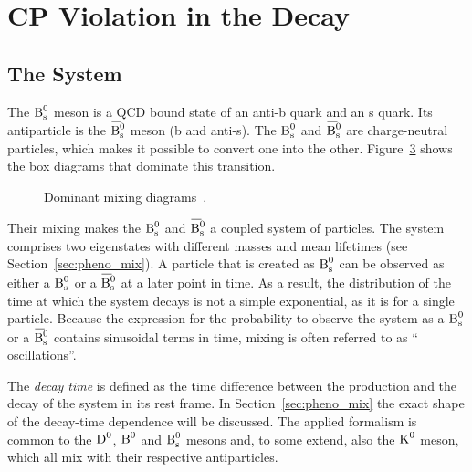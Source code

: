 \section{CP Violation in the \texorpdfstring{\BstoJpsiphi{}}{Bs0->Jpsiphi} Decay}
\label{sec:intro_Jpsiphi}

\subsection{The \texorpdfstring{\BsBsbar{}}{Bs0-Bs0bar} System}
\label{subsec:intro_Jpsiphi_Bs}

The $\text{B}_\text{s}^\text{0}$ meson is a QCD bound state of an anti-b quark and an s quark. Its antiparticle is the $\Bsbar$ meson (b and anti-s). The $\text{B}_\text{s}^\text{0}$
and $\Bsbar$ are charge-neutral particles, which makes it possible to convert one into the other.  Figure~\ref{fig:mixing} shows the box
diagrams that dominate this transition.
\begin{figure}[hbt]
  \centering
  \begin{subfigure}{0.5\textwidth}
    \centering
    
    \label{fig:mixing_1}
  \end{subfigure}%
  \begin{subfigure}{0.5\textwidth}
    \centering
    
    \label{fig:mixing_2}
  \end{subfigure}
  \caption{Dominant \BsBsbar{} mixing diagrams~\cite{LHCb-PAPER-2013-002}.}
  \label{fig:mixing}
\end{figure}

Their mixing makes the $\text{B}_\text{s}^\text{0}$ and $\Bsbar$ a coupled system of particles. The system comprises two eigenstates with different masses and
mean lifetimes (see Section~\ref{sec:pheno_mix}). A particle that is created as $\text{B}_\text{s}^\text{0}$ can be observed as either a $\text{B}_\text{s}^\text{0}$ or a $\Bsbar$ at a
later point in time. As a result, the distribution of the time at which the \BsBsbar{} system decays is not a simple exponential, as it is
for a single particle. Because the expression for the probability to observe the system as a $\text{B}_\text{s}^\text{0}$ or a $\Bsbar$ contains sinusoidal
terms in time, mixing is often referred to as ``\BsBsbar{} oscillations''.

The \emph{decay time} is defined as the time difference between the production and the decay of the \BsBsbar{} system in its rest frame. In
Section~\ref{sec:pheno_mix} the exact shape of the decay-time dependence will be discussed. The applied formalism is common to the $\text{D}^\text{0}$,
$\text{B}^\text{0}$ and $\text{B}_\text{s}^\text{0}$ mesons and, to some extend, also the $\text{K}^\text{0}$ meson, which all mix with their respective antiparticles.

